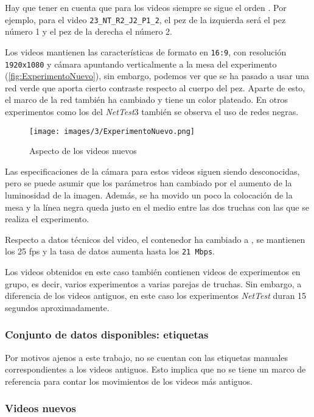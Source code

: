 Hay que tener en cuenta que para los videos siempre se sigue el orden \textit{}. Por ejemplo, para el video \verb|23_NT_R2_J2_P1_2|, el pez de la izquierda será el pez número 1 y 
el pez de la derecha el número 2.

Los videos mantienen las características de formato en \texttt{16:9}, con resolución \texttt{1920x1080} y cámara apuntando verticalmente a la mesa del experimento 
(\autoref{fig:ExperimentoNuevo}), sin embargo, podemos ver que se ha pasado a usar una red verde que aporta cierto contraste respecto al cuerpo del pez. Aparte de esto, 
el marco de la red también ha cambiado y tiene un color plateado. En otros experimentos como los del \textit{NetTest}3 también se observa el uso de redes negras.

\begin{figure}[H]
    \centering
    \texttt{[image: images/3/ExperimentoNuevo.png]}
    \caption{Aspecto de los videos nuevos}
    \label{fig:ExperimentoNuevo}
\end{figure}

Las especificaciones de la cámara para estos videos siguen siendo desconocidas, pero se puede asumir que los parámetros han cambiado por el aumento de la luminosidad de la imagen.
Además, se ha movido un poco la colocación de la mesa y la línea negra queda justo en el medio entre las dos truchas con las que se realiza el experimento.

Respecto a datos técnicos del video, el contenedor ha cambiado a \texttt{}, se mantienen los 25 \acrshort{fps} y la tasa de datos aumenta hasta los \texttt{21 Mbps}.

Los videos obtenidos en este caso también contienen videos de experimentos en grupo, es decir, varios experimentos a varias parejas de truchas. Sin embargo, a diferencia de los videos antiguos, 
en este caso los experimentos \textit{NetTest} duran 15 segundos aproximadamente.

\subsubsection{Conjunto de datos disponibles: etiquetas}

Por motivos ajenos a este trabajo, no se cuentan con las etiquetas manuales correspondientes a los videos antiguos. Esto implica que no se tiene un marco de referencia para 
contar los movimientos de los videos más antiguos.

\subsubsection*{Videos nuevos}

